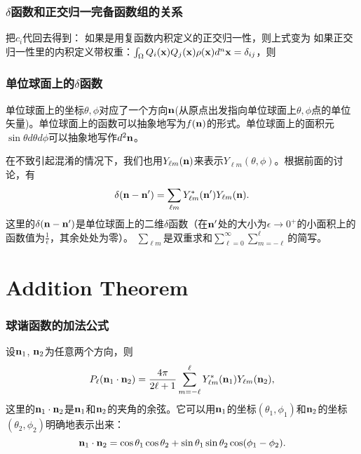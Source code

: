 \documentclass[CJK]{beamer}
\begin{document}
\begin{frame}
  \frametitle{$\delta$函数和正交归一完备函数组的关系}
  
  把$c_i$代回去得到：
  如果是用{\blue 复函数内积定义的正交归一性}，则上式变为
  如果正交归一性里的内积定义带权重：$\int_\Omega Q_i({\mathbf{x}})Q_j({\mathbf{x}})\rho({\mathbf{x}})d^n{\mathbf{x}} = \delta_{ij} $，则


  
\end{frame}

\begin{frame}
  \frametitle{单位球面上的$\delta$函数}
  
  单位球面上的坐标$\theta,\phi$对应了一个方向${\mathbf{n}}$(从原点出发指向单位球面上$\theta,\phi$点的单位矢量)。单位球面上的函数可以抽象地写为$f({\mathbf{n}})$的形式。单位球面上的面积元$\sin\theta d\theta d\phi$可以抽象地写作$d^2{\mathbf{n}}$。
  

  \skipline
  
  在不致引起混淆的情况下，我们也{\blue 用$Y_{\ell m}({\mathbf{n}})$来表示$Y_{\ell m}(\theta,\phi)$}。根据前面的讨论，有
{\blue
  $$\delta({\mathbf{n}}-{\mathbf{n}}') = \sum_{\ell m} Y_{\ell m}^*({\mathbf{n}}') Y_{\ell m}({\mathbf{n}}).$$}
这里的$\delta({\mathbf{n}}-{\mathbf{n}}')$是单位球面上的二维$\delta$函数（在${\mathbf{n}}'$处的大小为$\epsilon\rightarrow 0^+$的小面积上的函数值为$\frac{1}{\epsilon}$，其余处处为零）。
$\sum_{\ell m}$是双重求和$\sum_{\ell = 0}^\infty\sum_{m =-\ell}^\ell $的简写。
  
\end{frame}




\section{Addition Theorem}

\begin{frame}
  \frametitle{球谐函数的加法公式}
  
  设${\mathbf{n}}_1$, ${\mathbf{n}}_2$为任意两个方向，则
{\blue
  $$P_\ell ({\mathbf{n}}_1\cdot{\mathbf{n}}_2) = \frac{4\pi}{2\ell+1}\sum_{m=-\ell}^\ell Y_{\ell m}^*({\mathbf{n}}_1)Y_{\ell m}({\mathbf{n}}_2),$$}
这里的${\mathbf{n}}_1\cdot{\mathbf{n}}_2$是${\mathbf{n}}_1$和${\mathbf{n}}_2$的夹角的余弦。它可以用${\mathbf{n}}_1$的坐标$(\theta_1,\phi_1)$和${\mathbf{n}}_2$的坐标$(\theta_2,\phi_2)$明确地表示出来：
$${\mathbf{n}}_1\cdot{\mathbf{n}}_2 = \cos\theta_1\cos\theta_2+\sin\theta_1\sin\theta_2\cos(\phi_1-\phi_2) .$$

\end{frame}
\end{document}
